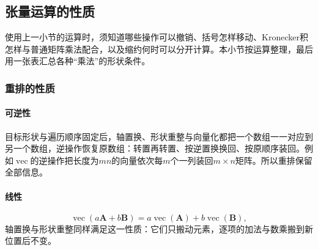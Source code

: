 \subsection{张量运算的性质}
\label{sec:ls-tensor-operation-properties}

使用上一小节的运算时，须知道哪些操作可以撤销、括号怎样移动、Kronecker积怎样与普通矩阵乘法配合，以及缩约何时可以分开计算。本小节按运算整理，最后用一张表汇总各种“乘法”的形状条件。

\subsubsection{重排的性质}

\paragraph{可逆性}
目标形状与遍历顺序固定后，轴置换、形状重整与向量化都把一个数组一一对应到另一个数组，逆操作恢复原数组：转置再转置、按逆置换换回、按原顺序装回。例如$\operatorname{vec}$的逆操作把长度为$mn$的向量依次每$m$个一列装回$m\times n$矩阵。所以重排保留全部信息。

\paragraph{线性}
\[
 \operatorname{vec}(a\bm A+b\bm B)=a\operatorname{vec}(\bm A)+b\operatorname{vec}(\bm B),
\]
轴置换与形状重整同样满足这一性质：它们只搬动元素，逐项的加法与数乘搬到新位置后不变。

